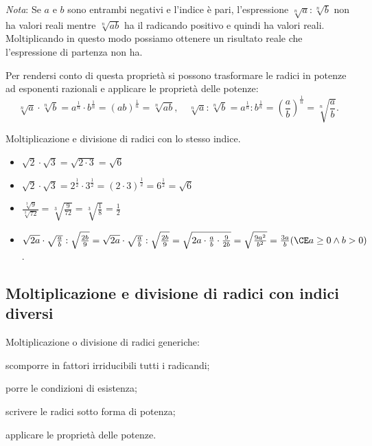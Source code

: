 \emph{Nota}: 
 Se $a$ e $b$ sono entrambi negativi e l'indice è pari, l'espressione
 $\sqrt[n]a:\sqrt[n]b$ non ha valori reali mentre $\sqrt[n]{ab}$ ha il
 radicando positivo e quindi ha valori reali. Moltiplicando in questo modo 
 possiamo ottenere un risultato reale che l'espressione di partenza non ha.

Per rendersi conto di questa proprietà si possono trasformare le radici in 
potenze ad esponenti razionali e applicare le proprietà delle potenze:
 \[\sqrt[n]a\cdot \sqrt[n]b=a^{\frac 1 n}\cdot b^{\frac 1 n}=(ab)^{\frac 1 n}=
   \sqrt[n]{ab},\quad \sqrt[n]a:\sqrt[n]b=a^{\frac 1 n}:b^{\frac 1 n}=
   \left(\dfrac a b\right)^{\frac 1 n}=\sqrt[n]{\dfrac a b}.\]

 \begin{esempio}
Moltiplicazione e divisione di radici con lo stesso indice.
\begin{itemize}
\item $\sqrt{2} \cdot \sqrt{3}=\sqrt{2 \cdot 3}=\sqrt 6$
\item $\sqrt{2} \cdot \sqrt{3}=
       2^{\frac{1}{2}} \cdot 3^{\frac{1}{2}}=(2  \cdot 3)^{\frac{1}{2}}=
       6^{\frac{1}{2}}=\sqrt 6$
\item $\frac{\sqrt[3]9}{\sqrt[3]{72}}=\sqrt[3]{\frac 9{72}}=
       \sqrt[3]{\frac 1 8}=\frac 1 2$
\item $\sqrt{2a}\cdot \sqrt{\frac a b}:\sqrt{\frac {2b} 9}=
       \sqrt{2a}\cdot \sqrt{\frac a b}:\sqrt{\frac {2b} 9}=
       \sqrt{2a\cdot \frac a b\cdot \frac 9{2b}}=\sqrt{\frac{9a^2}{b^2}}=
       \frac {3a} b 
      (\CE a\ge 0\wedge b>0)$.
\end{itemize}
 \end{esempio}

\subsection{Moltiplicazione e divisione di radici con indici diversi}

\begin{procedura}
Moltiplicazione o divisione di radici generiche:
\begin{enumeratea}
 \item scomporre in fattori irriducibili tutti i radicandi;
 \item porre le condizioni di esistenza;
 \item scrivere le radici sotto forma di potenza;
 \item applicare le proprietà delle potenze.
\end{enumeratea}
\end{procedura}

